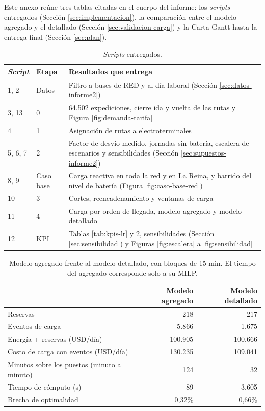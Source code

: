 Este anexo reúne tres tablas citadas en el cuerpo del informe: los \textit{scripts} entregados (Sección \ref{sec:implementacion}), la comparación entre el modelo agregado y el detallado (Sección \ref{sec:validacion-carga}) y la Carta Gantt hasta la entrega final (Sección \ref{sec:plan}).

\begin{table}[H]
\centering
\small
\begin{tabular}{llp{7.2cm}}
\toprule
\textit{Script} & Etapa & Resultados que entrega \\
\midrule
1, 2 & Datos & Filtro a buses de RED y al día laboral (Sección \ref{sec:datos-informe2}) \\
3, 13 & 0 & 64.502 expediciones, cierre ida y vuelta de las rutas y Figura \ref{fig:demanda-tarifa} \\
4 & 1 & Asignación de rutas a electroterminales \\
5, 6, 7 & 2 & Factor de desvío medido, jornadas sin batería, escalera de escenarios y sensibilidades (Sección \ref{sec:supuestos-informe2}) \\
8, 9 & Caso base & Carga reactiva en toda la red y en La Reina, y barrido del nivel de batería (Figura \ref{fig:caso-base-red}) \\
10 & 3 & Cortes, reencadenamiento y ventanas de carga \\
11 & 4 & Carga por orden de llegada, modelo agregado y modelo detallado \\
12 & KPI & Tablas \ref{tab:kpis-lr} y \ref{tab:detallado-agregado}, sensibilidades (Sección \ref{sec:sensibilidad}) y Figuras \ref{fig:escalera} a \ref{fig:sensibilidad} \\
\bottomrule
\end{tabular}
\caption{\textit{Scripts} entregados.}
\label{tab:scripts}
\end{table}

\begin{table}[H]
\centering
\small
\begin{tabular}{p{6.8cm}rr}
\toprule
 & Modelo agregado & Modelo detallado \\
\midrule
Reservas & 218 & 217 \\
Eventos de carga & 5.866 & 1.675 \\
Energía + reservas (USD/día) & 100.905 & 100.666 \\
Costo de carga con eventos (USD/día) & 130.235 & 109.041 \\
Minutos sobre los puestos (minuto a minuto) & 124 & 32 \\
Tiempo de cómputo (s) & 89 & 3.605 \\
Brecha de optimalidad & 0,32\% & 0,66\% \\
\bottomrule
\end{tabular}
\caption{Modelo agregado frente al modelo detallado, con bloques de 15 min. El tiempo del agregado corresponde solo a su MILP.}
\label{tab:detallado-agregado}
\end{table}

